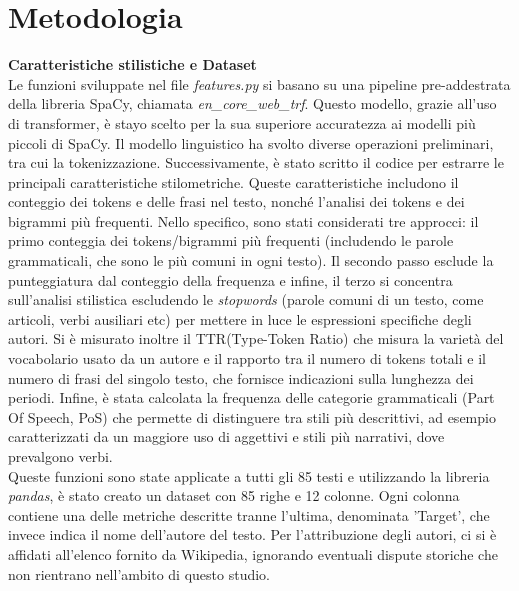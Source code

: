\documentclass[a4paper, 12pt]{article}
\begin{document}
\section{\textbf{Metodologia}}
\textbf{Caratteristiche stilistiche e Dataset}\\
Le funzioni sviluppate nel file \textit{features.py} si basano su una pipeline pre-addestrata della libreria SpaCy, chiamata \textit{en\_core\_web\_trf}. Questo modello, grazie all'uso di transformer, è stayo scelto per la sua superiore accuratezza ai modelli più piccoli di SpaCy. Il modello linguistico ha svolto diverse operazioni preliminari, tra cui la tokenizzazione. Successivamente, è stato scritto il codice per estrarre le principali caratteristiche stilometriche. Queste caratteristiche includono il conteggio dei tokens e delle frasi nel testo, nonché l'analisi dei tokens e dei bigrammi più frequenti.
Nello specifico, sono stati considerati tre approcci: il primo conteggia  dei tokens/bigrammi più frequenti (includendo le parole grammaticali, che sono le più comuni in ogni testo). Il secondo passo esclude la punteggiatura dal conteggio della frequenza e infine,  il terzo si concentra sull'analisi stilistica escludendo le \textit{stopwords} (parole comuni di un testo, come articoli, verbi ausiliari etc) per mettere in luce le espressioni specifiche degli autori.
Si è misurato inoltre il TTR(Type-Token Ratio) che misura la varietà del vocabolario usato da un autore e il rapporto tra il numero di tokens totali e il numero di frasi del singolo testo, che fornisce indicazioni sulla lunghezza dei periodi. Infine, è stata calcolata la frequenza delle categorie grammaticali (Part Of Speech, PoS) che permette di distinguere tra stili più descrittivi, ad esempio caratterizzati da un maggiore uso di aggettivi e stili più narrativi, dove prevalgono verbi.\\

Queste funzioni sono state applicate a tutti gli 85 testi e utilizzando la libreria \textit{pandas}, è stato creato un dataset con 85 righe e 12 colonne. Ogni colonna contiene una delle metriche descritte tranne l'ultima, denominata 'Target', che invece indica il nome dell'autore del testo. Per l'attribuzione degli autori, ci si è affidati all'elenco fornito da Wikipedia, ignorando eventuali dispute storiche che non rientrano nell'ambito di questo studio.\\
\end{document}

